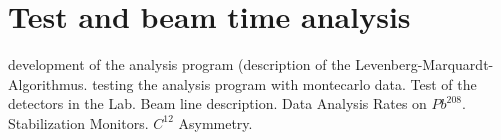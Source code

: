 \chapter{Test and beam time analysis} \label{analysis}

\begin{outline}[enumerate]
\1 development of the analysis program (description of the Levenberg-Marquardt-Algorithmus.
\1 testing the analysis program with montecarlo data.
\1 Test of the detectors in the Lab.
\1 Beam line description.
\1 Data Analysis
	\2 Rates on $Pb^{208}$.
	\2 Stabilization Monitors.
	\2 $C^{12}$ Asymmetry.
\end{outline}